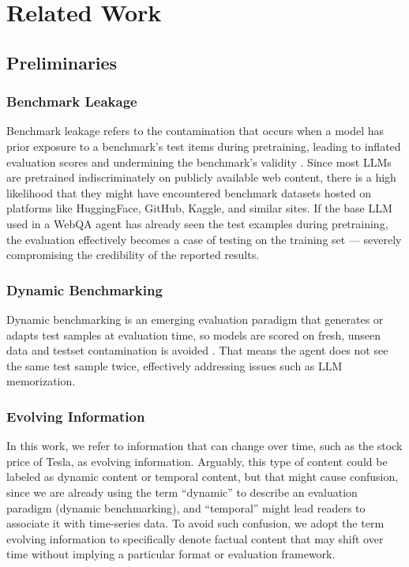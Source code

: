\section{Related Work}

\subsection{Preliminaries}

\subsubsection{Benchmark Leakage}

Benchmark leakage refers to the contamination that occurs when a model has prior exposure to a benchmark's test items during pretraining, leading to inflated evaluation scores and undermining the benchmark's validity \cite{zhouDontMakeYour2023,zhuDyValDynamicEvaluation2024b}. Since most LLMs are pretrained indiscriminately on publicly available web content, there is a high likelihood that they might have encountered benchmark datasets hosted on platforms like HuggingFace, GitHub, Kaggle, and similar sites. If the base LLM used in a WebQA agent has already seen the test examples during pretraining, the evaluation effectively becomes a case of testing on the training set — severely compromising the credibility of the reported results.

\subsubsection{Dynamic Benchmarking}

Dynamic benchmarking is an emerging evaluation paradigm that generates or adapts test samples at evaluation time, so models are scored on fresh, unseen data and testset contamination is avoided \cite{zhuDyValDynamicEvaluation2024b,kielaDynabenchRethinkingBenchmarking2021a,maDynaboardEvaluationAsAServicePlatform2021,zhuDynamicEvaluationLarge2024,zhangDARGDynamicEvaluation2024,rawlesAndroidWorldDynamicBenchmarking2025}. That means the agent does not see the same test sample twice, effectively addressing issues such as LLM memorization.

\subsubsection{Evolving Information}

In this work, we refer to information that can change over time, such as the stock price of Tesla, as evolving information. Arguably, this type of content could be labeled as dynamic content or temporal content, but that might cause confusion, since we are already using the term ``dynamic'' to describe an evaluation paradigm (dynamic benchmarking), and ``temporal'' might lead readers to associate it with time-series data. To avoid such confusion, we adopt the term evolving information to specifically denote factual content that may shift over time without implying a particular format or evaluation framework.

